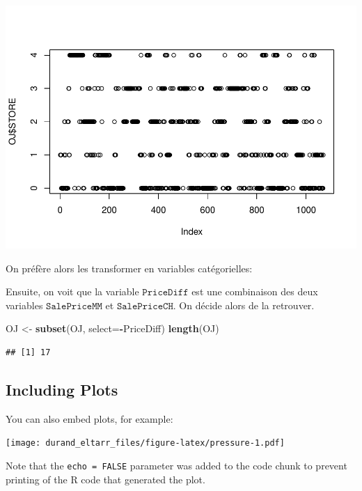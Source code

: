 \documentclass[]{article}
\newenvironment{Shaded}{\begin{snugshade}}{\end{snugshade}}
\newcommand{\CommentTok}[1]{\textcolor[rgb]{0.56,0.35,0.01}{\textit{#1}}}
\newcommand{\DataTypeTok}[1]{\textcolor[rgb]{0.13,0.29,0.53}{#1}}
\newcommand{\DecValTok}[1]{\textcolor[rgb]{0.00,0.00,0.81}{#1}}
\newcommand{\KeywordTok}[1]{\textcolor[rgb]{0.13,0.29,0.53}{\textbf{#1}}}
\newcommand{\NormalTok}[1]{#1}
\newcommand{\OperatorTok}[1]{\textcolor[rgb]{0.81,0.36,0.00}{\textbf{#1}}}
\newcommand{\StringTok}[1]{\textcolor[rgb]{0.31,0.60,0.02}{#1}}
\begin{document}
\includegraphics{durand_eltarr_files/figure-latex/unnamed-chunk-5-1.pdf}

On préfère alors les transformer en variables catégorielles:

\begin{Shaded}
\end{Shaded}

Ensuite, on voit que la variable \(\texttt{PriceDiff}\) est une
combinaison des deux variables \(\texttt{SalePriceMM}\) et
\(\texttt{SalePriceCH}\). On décide alors de la retrouver.

\begin{Shaded}
\begin{Highlighting}[]
\NormalTok{OJ <-}\StringTok{ }\KeywordTok{subset}\NormalTok{(OJ, }\DataTypeTok{select=}\OperatorTok{-}\NormalTok{PriceDiff)}
\KeywordTok{length}\NormalTok{(OJ)}
\end{Highlighting}
\end{Shaded}

\begin{verbatim}
## [1] 17
\end{verbatim}

\hypertarget{including-plots}{%
\subsection{Including Plots}\label{including-plots}}

You can also embed plots, for example:

\texttt{[image: durand\_eltarr\_files/figure-latex/pressure-1.pdf]}

Note that the \texttt{echo\ =\ FALSE} parameter was added to the code
chunk to prevent printing of the R code that generated the plot.
\end{document}

